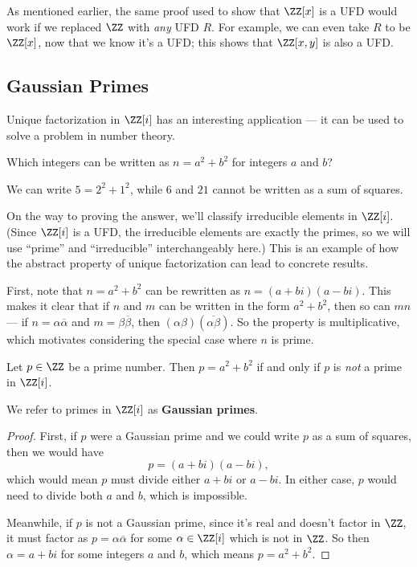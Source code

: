 As mentioned earlier, the same proof used to show that $\ZZ[x]$ is a UFD would work if we replaced $\ZZ$ with \emph{any} UFD $R$. For example, we can even take $R$ to be $\ZZ[x]$, now that we know it's a UFD; this shows that $\ZZ[x, y]$ is also a UFD. 

\subsection{Gaussian Primes}

Unique factorization in $\ZZ[i]$ has an interesting application --- it can be used to solve a problem in number theory. 

\begin{qq}
Which integers can be written as $n = a^2 + b^2$ for integers $a$ and $b$?
\end{qq}

\begin{example}
    We can write $5 = 2^2 + 1^2$, while $6$ and $21$ cannot be written as a sum of squares. 
\end{example}

On the way to proving the answer, we'll classify irreducible elements in $\ZZ[i]$. (Since $\ZZ[i]$ is a UFD, the irreducible elements are exactly the primes, so we will use ``prime'' and ``irreducible'' interchangeably here.) This is an example of how the abstract property of unique factorization can lead to concrete results. 

First, note that $n = a^2 + b^2$ can be rewritten as $n = (a + bi)(a - bi)$. This makes it clear that if $n$ and $m$ can be written in the form $a^2 + b^2$, then so can $mn$ --- if $n = \alpha\overline{\alpha}$ and $m = \beta\overline{\beta}$, then $(\alpha\beta)(\overline{\alpha\beta})$. So the property is multiplicative, which motivates considering the special case where $n$ is prime.  

\begin{lemma}
Let $p \in \ZZ$ be a prime number. Then $p = a^2 + b^2$ if and only if $p$ is \emph{not} a prime in $\ZZ[i]$.
\end{lemma}

We refer to primes in $\ZZ[i]$ as \textbf{Gaussian primes}.

\begin{proof}
First, if $p$ were a Gaussian prime and we could write $p$ as a sum of squares, then we would have \[p = (a + bi)(a - bi),\] which would mean $p$ must divide either $a + bi$ or $a - bi$. In either case, $p$ would need to divide both $a$ and $b$, which is impossible. 

Meanwhile, if $p$ is not a Gaussian prime, since it's real and doesn't factor in $\ZZ$, it must factor as $p = \alpha\overline{\alpha}$ for some $\alpha \in \ZZ[i]$ which is not in $\ZZ$. So then $\alpha = a + bi$ for some integers $a$ and $b$, which means $p = a^2 + b^2$. 
\end{proof}

